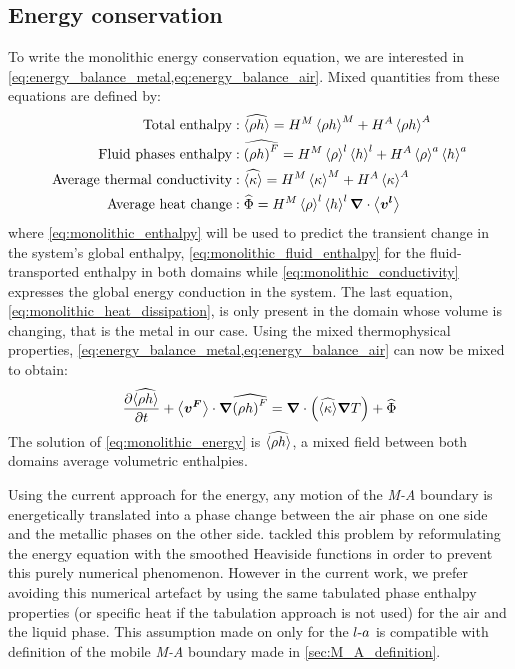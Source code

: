 \subsection{Energy conservation}
To write the monolithic energy conservation equation, we are interested in \cref{eq:energy_balance_metal,eq:energy_balance_air}.
Mixed quantities from these equations are defined by:
\begin{align}
%
\label{eq:monolithic_enthalpy}
\text{Total enthalpy}&: \mix{\avg{\rho h}} =  \heavisideM \avg{\rho h}^M + \heavisideA \avg{\rho h}^A  \\
%
\label{eq:monolithic_fluid_enthalpy}
\text{Fluid phases enthalpy}&: \mix{\brac{\rho h}^F} = \heavisideM \rhol \hl + \heavisideA \rhoa \ha \\
%
\label{eq:monolithic_conductivity}
\text{Average thermal conductivity}&: \mix{\avg{\kappa}} = \heavisideM \avg{\kappa}^M + \heavisideA \avg{\kappa}^A \\
%
\label{eq:monolithic_heat_dissipation}
\text{Average heat change}&: \mix{\Phi} = \heavisideM \rhol \hl \nabvec \cdot \vit
\end{align}
where \cref{eq:monolithic_enthalpy} will be used to predict the transient change in the system's global enthalpy, 
\cref{eq:monolithic_fluid_enthalpy} for the fluid-transported enthalpy in both domains while \cref{eq:monolithic_conductivity}
expresses the global energy conduction in the system. The last equation, \cref{eq:monolithic_heat_dissipation}, is only present in the 
domain whose volume is changing, that is the metal in our case.
Using the mixed thermophysical properties, \cref{eq:energy_balance_metal,eq:energy_balance_air} can now be mixed to obtain:
\begin{align}
\label{eq:monolithic_energy}
\frac{\partial \widehat{\left \langle \rho h \right \rangle}}{\partial t} 
		+ \left \langle \boldsymbol{v^F} \right \rangle \cdot \boldsymbol{\nabla} \widehat{\left( \rho h \right)^F}
		= \boldsymbol{\nabla}  \cdot \left( \widehat{\left \langle \kappa \right \rangle} \boldsymbol{\nabla} T  \right)
		+ \widehat{\Phi} 
\end{align}
The solution of \cref{eq:monolithic_energy} is $\widehat{\left \langle \rho h \right \rangle}$, 
a mixed field between both domains average volumetric enthalpies. 

Using the current approach for the energy, any motion of the \emph{M-A} boundary is energetically translated
into a phase change between the air phase on one side and the metallic phases on the other side.
\citet{chen_three_2014} tackled this problem by reformulating the energy equation with the smoothed Heaviside functions in order to prevent 
this purely numerical phenomenon. However in the current work, we prefer avoiding this numerical artefact by 
using the same tabulated phase enthalpy properties (or specific heat if the tabulation approach is not used) for
the air and the liquid phase. This assumption made on only for the $l\text{-}a$ is compatible with definition of the mobile \emph{M-A}
boundary made in \cref{sec:M_A_definition}.


